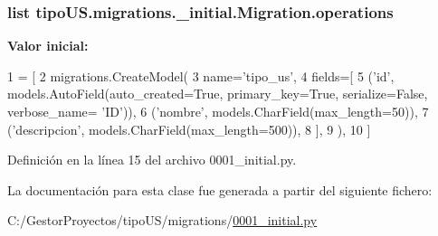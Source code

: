 \subsubsection[{\texorpdfstring{operations}{operations}}]{\setlength{\rightskip}{0pt plus 5cm}list tipo\+U\+S.\+migrations.\+\_\+initial.\+Migration.\+operations\hspace{0.3cm}{\ttfamily [static]}}\hypertarget{classtipo_u_s_1_1migrations_1_10001__initial_1_1_migration_ac7741faef55d0650df75f2bc97a065d0}{}\label{classtipo_u_s_1_1migrations_1_10001__initial_1_1_migration_ac7741faef55d0650df75f2bc97a065d0}
{\bfseries Valor inicial\+:}
\begin{DoxyCode}
1 = [
2         migrations.CreateModel(
3             name=\textcolor{stringliteral}{'tipo\_us'},
4             fields=[
5                 (\textcolor{stringliteral}{'id'}, models.AutoField(auto\_created=\textcolor{keyword}{True}, primary\_key=\textcolor{keyword}{True}, serialize=\textcolor{keyword}{False}, verbose\_name=\textcolor{stringliteral}{
      'ID'})),
6                 (\textcolor{stringliteral}{'nombre'}, models.CharField(max\_length=50)),
7                 (\textcolor{stringliteral}{'descripcion'}, models.CharField(max\_length=500)),
8             ],
9         ),
10     ]
\end{DoxyCode}


Definición en la línea 15 del archivo 0001\+\_\+initial.\+py.



La documentación para esta clase fue generada a partir del siguiente fichero\+:\begin{DoxyCompactItemize}
\item 
C\+:/\+Gestor\+Proyectos/tipo\+U\+S/migrations/\hyperlink{tipo_u_s_2migrations_20001__initial_8py}{0001\+\_\+initial.\+py}\end{DoxyCompactItemize}
